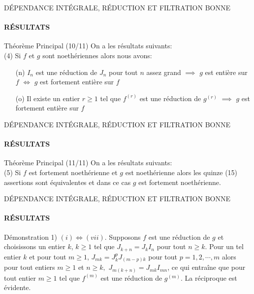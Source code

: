 \documentclass[11pt,a4paper]{beamer}
\begin{document}
\begin{frame}{DÉPENDANCE INTÉGRALE, RÉDUCTION ET FILTRATION BONNE}
	\framesubtitle{RÉSULTATS}
	\begin{block}{Théorème Principal (10/11)}
		On a les résultats suivants:\\
		(4) Si $f$ et $g$ sont noethériennes alors nous avons:
		\begin{enumerate}
			\item[(n)] $I_{n}$ est une réduction de $J_{n}$ pour tout $n$ assez grand $\implies$ $g$ est entière sur $f$ $\Longleftrightarrow$ $g$ est fortement entière sur $f$
			\item[(o)] Il existe un entier $r\geq 1$ tel que $f^{(r)}$ est une réduction de $g^{(r)}$ $\implies$ $g$ est fortement entière sur $f$
		\end{enumerate}
	\end{block}
\end{frame}

\begin{frame}{DÉPENDANCE INTÉGRALE, RÉDUCTION ET FILTRATION BONNE}
	\framesubtitle{RÉSULTATS}
	\begin{block}{Théorème Principal (11/11)}
		On a les résultats suivants:\\
		(5) Si $f$ est fortement noethérienne et $g$ est noethérienne alors les quinze (15) assertions sont équivalentes et dans ce cas $g$ est fortement noethérienne.
	\end{block}
\end{frame}

\begin{frame}{DÉPENDANCE INTÉGRALE, RÉDUCTION ET FILTRATION BONNE}
	\framesubtitle{RÉSULTATS}
	\begin{block}{Démonstration}
			1)
		$(i)\Longleftrightarrow (vii).$
		Supposons $f$ est une réduction de $g$ et choisissons un entier $k$, $k \geqslant 1$ tel que $J_{k+n}  = J_{k}I_n$ pour tout $n \geqslant k$. Pour un tel entier $k$ et pour tout $m \geqslant 1$, $J_{mk}=J_{k}^{p}J_{(m-p)k}
		$ pour tout $p=1,2,\cdots,m$ alors pour tout
		entiers $m\geq 1$ et $n\geq k,$ $J_{m(k+n)}=J_{mk}I_{mn}$, ce qui entraîne que pour tout entier $m\geq 1$ tel que $f^{(m)}$ est une réduction de $g^{(m)}.$
		La réciproque est évidente.
	\end{block}
\end{frame}
\end{document}
